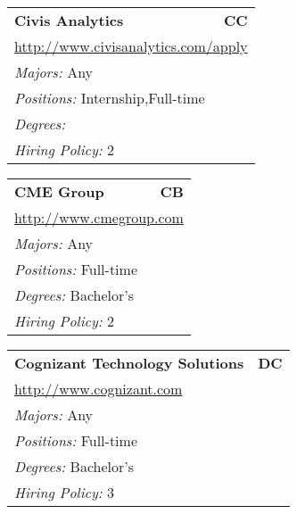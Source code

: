 \documentclass[twoside]{article}
\begin{document}
\begin{center}
\begin{multicols}{3}
\begin{FlushLeft}
\begin{minipage}{.9\columnwidth}
\end{minipage}
 
\begin{minipage}{.9\columnwidth}\begin{tabularx}{.95\columnwidth}{Xr}
                 {\Large\bf Civis Analytics} & {\Large\bf CC}\\
    \multicolumn{2}{p{.95\columnwidth}}{\url{http://www.civisanalytics.com/apply}}\\
    \multicolumn{2}{p{.95\columnwidth}}{\emph{Majors:} Any}\\
    \multicolumn{2}{p{.95\columnwidth}}{\emph{Positions:} Internship,Full-time}\\
    \multicolumn{2}{p{.95\columnwidth}}{\emph{Degrees:} }\\
    \multicolumn{2}{p{.95\columnwidth}}{\emph{Hiring Policy:} 2}\\
    \end{tabularx}
    
\end{minipage}
 
\begin{minipage}{.9\columnwidth}\begin{tabularx}{.95\columnwidth}{Xr}
                 {\Large\bf CME Group} & {\Large\bf CB}\\
    \multicolumn{2}{p{.95\columnwidth}}{\url{http://www.cmegroup.com}}\\
    \multicolumn{2}{p{.95\columnwidth}}{\emph{Majors:} Any}\\
    \multicolumn{2}{p{.95\columnwidth}}{\emph{Positions:} Full-time}\\
    \multicolumn{2}{p{.95\columnwidth}}{\emph{Degrees:} Bachelor's}\\
    \multicolumn{2}{p{.95\columnwidth}}{\emph{Hiring Policy:} 2}\\
    \end{tabularx}
    
\end{minipage}
 
\begin{minipage}{.9\columnwidth}\begin{tabularx}{.95\columnwidth}{Xr}
                 {\Large\bf Cognizant Technology Solutions} & {\Large\bf DC}\\
    \multicolumn{2}{p{.95\columnwidth}}{\url{http://www.cognizant.com}}\\
    \multicolumn{2}{p{.95\columnwidth}}{\emph{Majors:} Any}\\
    \multicolumn{2}{p{.95\columnwidth}}{\emph{Positions:} Full-time}\\
    \multicolumn{2}{p{.95\columnwidth}}{\emph{Degrees:} Bachelor's}\\
    \multicolumn{2}{p{.95\columnwidth}}{\emph{Hiring Policy:} 3}\\
    \end{tabularx}
    

\end{minipage}
\end{FlushLeft}
\end{multicols}
\end{center}
\end{document}
